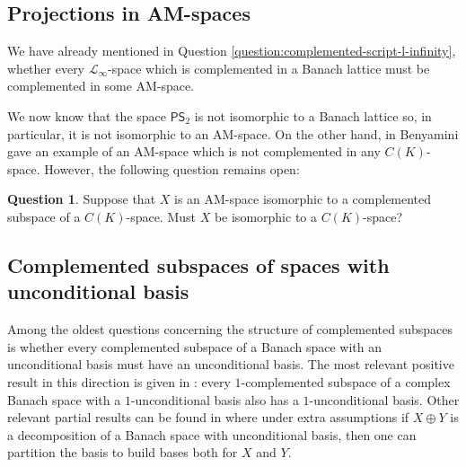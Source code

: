 \documentclass[11pt]{amsart}
\theoremstyle{definition}
\newtheorem{question}{Question}
\numberwithin{equation}{section}
\begin{document}
\subsection{Projections in AM-spaces}

We have already mentioned in Question \ref{question:complemented-script-l-infinity}, whether every $\mathcal{L}_\infty$-space which is complemented in a Banach lattice must be complemented in some AM-space.
 
We now know that the space $\textsf{PS}_2$ is not isomorphic to a Banach lattice \cite{dHMST23} so, in particular, it is not isomorphic to an AM-space. On the other hand, in \cite{B77} Benyamini gave an example of an AM-space which is not complemented in any $C(K)$-space. However, the following question remains open:

\begin{question}
Suppose that $X$ is an AM-space isomorphic to a complemented subspace of a $C(K)$-space. Must $X$ be isomorphic to a $C(K)$-space?    
\end{question}





\subsection{Complemented subspaces of spaces with unconditional basis}
Among the oldest questions concerning the structure of complemented subspaces is whether every complemented subspace of a Banach space with an unconditional basis must have an unconditional basis. The most relevant positive result in this direction is given in \cite{KW}: every $1$-complemented subspace of a complex Banach space with a $1$-unconditional basis also has a $1$-unconditional basis. Other relevant partial results can be found in \cite{EW76, W78} where under extra assumptions if $X\oplus Y$ is a decomposition of a Banach space with unconditional basis, then one can partition the basis to build bases both for $X$ and $Y$. 
\end{document}
